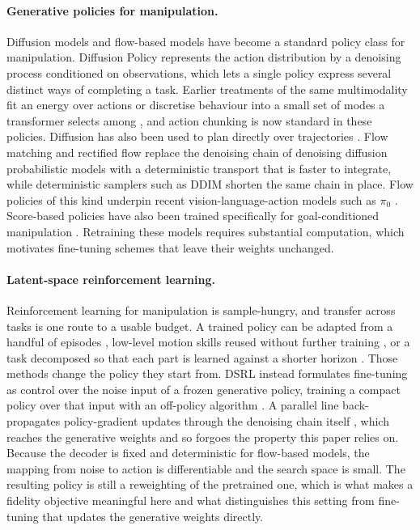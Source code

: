 \documentclass[preprint,12pt]{elsarticle}
\begin{document}
\paragraph{Generative policies for manipulation.}
Diffusion models and flow-based models have become a standard policy class for
manipulation. Diffusion Policy \citep{chi2023diffusionpolicy} represents the
action distribution by a denoising process conditioned on observations, which
lets a single policy express several distinct ways of completing a task.
Earlier treatments of the same multimodality fit an energy over actions
\citep{florence2022ibc} or discretise behaviour into a small set of modes a
transformer selects among \citep{shafiullah2022bet}, and action chunking
\citep{zhao2023act} is now standard in these policies. Diffusion has also been
used to plan directly over trajectories \citep{janner2022diffuser}. Flow
matching \citep{lipman2022flowmatching} and rectified flow
\citep{liu2022rectifiedflow} replace the denoising chain of denoising diffusion
probabilistic models \citep{ho2020ddpm} with a deterministic transport that is
faster to integrate, while deterministic samplers such as DDIM
\citep{song2021ddim} shorten the same chain in place. Flow policies of this
kind underpin recent vision-language-action models such as $\pi_0$
\citep{black2024pi0}. Score-based
policies have also been trained specifically for goal-conditioned manipulation
\citep{reuss2023beso}. Retraining these models requires substantial computation, which motivates
fine-tuning schemes that leave their weights unchanged.

\paragraph{Latent-space reinforcement learning.}
Reinforcement learning for manipulation is sample-hungry, and transfer across
tasks is one route to a usable budget. A trained policy can be adapted from a
handful of episodes \citep{he2024fewshot}, low-level motion skills reused
without further training \citep{he2026zeroshot}, or a task decomposed so that
each part is learned against a shorter horizon \citep{he2026decomposition}.
Those methods change the policy they start from.
DSRL \citep{wagenmaker2025dsrl} instead formulates fine-tuning as control over the noise
input of a frozen generative policy, training a compact policy over that input
with an off-policy algorithm \citep{haarnoja2018sac}. A parallel line
back-propagates policy-gradient updates through the denoising chain itself
\citep{ren2024dppo}, which reaches the generative weights and so forgoes the
property this paper relies on. Because the decoder is
fixed and deterministic for flow-based models, the mapping from noise to action
is differentiable and the search space is small. The resulting policy is still a
reweighting of the pretrained one, which is what makes a fidelity objective
meaningful here and what distinguishes this setting from fine-tuning that updates
the generative weights directly.
\end{document}
